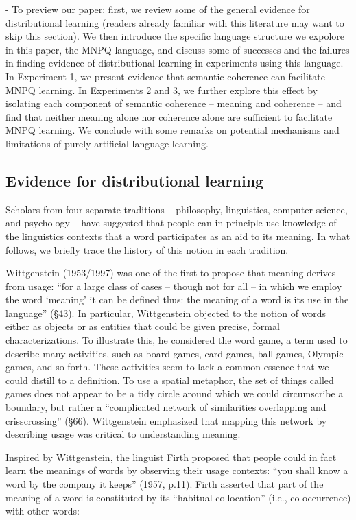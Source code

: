 \documentclass[man,floatsintext]{apa6}
\begin{document}
- To preview our paper: first, we review some of the general evidence for distributional learning (readers already familiar with this literature may want to skip this section). We then introduce the specific language structure we expolore in this paper, the MNPQ language, and discuss some of successes and the failures in finding evidence of distributional learning in experiments using this language. In Experiment 1, we present evidence that semantic coherence can facilitate MNPQ learning. In Experiments 2 and 3, we further explore this effect by isolating each component of semantic coherence -- meaning and coherence -- and find that neither meaning alone nor coherence alone are sufficient to facilitate MNPQ learning. We conclude with some remarks on potential mechanisms and limitations of purely artificial language learning.

\subsection{Evidence for distributional learning}

Scholars from four separate traditions -- philosophy, linguistics, computer science, and psychology -- have suggested that people can in principle use knowledge of the linguistics contexts that a word participates as an aid to its meaning. In what follows, we briefly trace the history of this notion in each tradition.

Wittgenstein (1953/1997) was one of the first to propose that meaning derives from usage: ``for a large class of cases -- though not for all -- in which we employ the word `meaning' it can be defined thus: the meaning of a word is its use in the language'' (\S 43). In particular, Wittgenstein objected to the notion of words either as objects or as entities that could be given precise, formal characterizations. To illustrate this, he considered the word game, a term used to describe many activities, such as board games, card games, ball games, Olympic games, and so forth. These activities seem to lack a common essence that we could distill to a definition. To use a spatial metaphor, the set of things called games does not appear to be a tidy circle around which we could circumscribe a boundary, but rather a ``complicated network of similarities overlapping and crisscrossing'' (\S 66). Wittgenstein emphasized that mapping this network by describing usage was critical to understanding meaning.

Inspired by Wittgenstein, the linguist Firth proposed that people could in fact learn the meanings of words by observing their usage contexts: ``you shall know a word by the company it keeps'' (1957, p.11). Firth asserted that part of the meaning of a word is constituted by its ``habitual collocation'' (i.e., co-occurrence) with other words:
\end{document}
